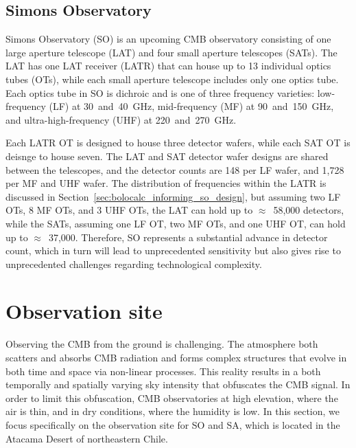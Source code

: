 
\subsection{Simons Observatory}
\label{sec:simons_observatory_description}

Simons Observatory (SO) is an upcoming CMB observatory consisting of one large aperture telescope (LAT) and four small aperture telescopes (SATs). The LAT has one LAT receiver (LATR) that can house up to 13 individual optics tubes (OTs), while each small aperture telescope includes only one optics tube. Each optics tube in SO is dichroic and is one of three frequency varieties: low-frequency (LF) at 30~and~40~GHz, mid-frequency (MF) at 90~and~150~GHz, and ultra-high-frequency (UHF) at 220~and~270~GHz. 

Each LATR OT is designed to house three detector wafers, while each SAT OT is deisnge to house seven. The LAT and SAT detector wafer designs are shared between the telescopes, and the detector counts are 148 per LF wafer, and 1,728 per MF and UHF wafer. The distribution of frequencies within the LATR is discussed in Section~\ref{sec:bolocalc_informing_so_design}, but assuming two LF OTs, 8 MF OTs, and 3 UHF OTs, the LAT can hold up to $\approx$~58,000 detectors, while the SATs, assuming one LF OT, two MF OTs, and one UHF OT, can hold up to $\approx$~37,000. Therefore, SO represents a substantial advance in detector count, which in turn will lead to unprecedented sensitivity but also gives rise to unprecedented challenges regarding technological complexity.


\section{Observation site}
\label{sec:observation_site}

Observing the CMB from the ground is challenging. The atmosphere both scatters and absorbs CMB radiation and forms complex structures that evolve in both time and space via non-linear processes. This reality results in a both temporally and spatially varying sky intensity that obfuscates the CMB signal. In order to limit this obfuscation, CMB observatories at high elevation, where the air is thin, and in dry conditions, where the humidity is low. In this section, we focus specifically on the observation site for SO and SA, which is located in the Atacama Desert of northeastern Chile.

